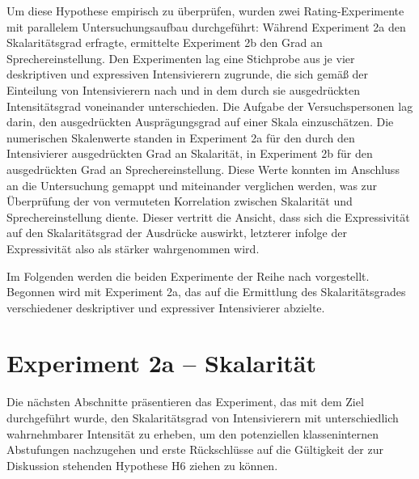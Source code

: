 \noindent Um diese Hypothese empirisch zu überprüfen, wurden zwei Rating-Experimente mit parallelem Untersuchungsaufbau durchgeführt: Während Experiment 2a den Skalaritätsgrad erfragte, ermittelte Experiment 2b den Grad an Sprechereinstellung. Den Experimenten lag eine Stichprobe aus je vier deskriptiven und expressiven Intensivierern zugrunde, die sich gemäß der Einteilung von Intensivierern nach {\citet[87]{Biedermann.1969}} und {\citet[408]{Breindl.2007}} in dem durch sie ausgedrückten Intensitätsgrad voneinander unterschieden. Die Aufgabe der Versuchspersonen lag darin, den ausgedrückten Ausprägungsgrad auf einer Skala einzuschätzen. Die numerischen Skalenwerte standen in Experiment 2a für den durch den Intensivierer ausgedrückten Grad an Skalarität, in Experiment 2b für den ausgedrückten Grad an Sprechereinstellung. Diese Werte konnten im Anschluss an die Untersuchung gemappt und miteinander verglichen werden, was zur Überprüfung der von \citet[133]{Gutzmann.2019a} vermuteten Korrelation zwischen Skalarität und Sprechereinstellung diente. Dieser vertritt die Ansicht, dass sich die Expressivität auf den Skalaritätsgrad der Ausdrücke auswirkt, letzterer infolge der Expressivität also als stärker wahrgenommen wird.


Im Folgenden werden die beiden Experimente der Reihe nach vorgestellt. Begonnen wird mit Experiment 2a, das auf die Ermittlung des Skalaritätsgrades verschiedener deskriptiver und expressiver Intensivierer abzielte. 




\section{Experiment 2a -- Skalarität}\label{abs:Skalarität}
Die nächsten Abschnitte präsentieren das Experiment, das mit dem Ziel durchgeführt wurde, den Skalaritätsgrad von Intensivierern mit unterschiedlich wahrnehmbarer Intensität zu erheben, um den potenziellen klasseninternen Abstufungen nachzugehen und erste Rückschlüsse auf die Gültigkeit der zur Diskussion stehenden Hypothese H6 ziehen zu können.



